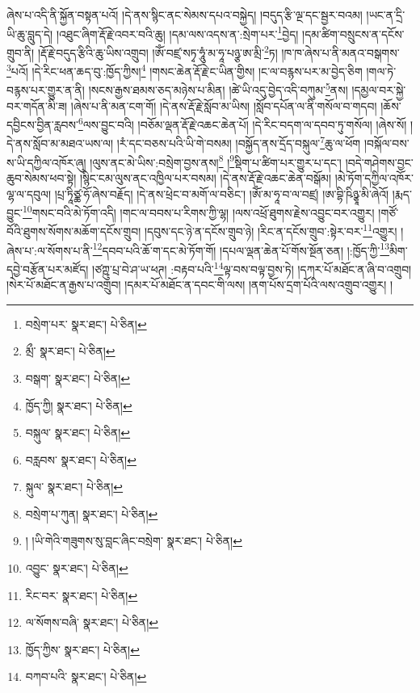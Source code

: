 ཞེས་པ་འདི་ནི་སྐྱོན་བསྟན་པའོ། །དེ་ནས་སྙིང་ནང་སེམས་དཔའ་བསྐྱེད། །བདུད་རྩི་ལྔ་དང་སྦྱར་བའམ། །ཡང་ན་དྲི་ཡི་ཆུ་བླུད་དེ། །འཐུང་ཞིག་རྡོ་རྗེ་འབར་བའི་ཆུ། །དམ་ལས་འདས་ན་:སྲེག་པར་\footnote{བསྲེག་པར་  སྣར་ཐང་།  པེ་ཅིན། }བྱེད། །དམ་ཚིག་བསྲུངས་ན་དངོས་གྲུབ་ནི། །རྡོ་རྗེ་བདུད་རྩིའི་ཆུ་ཡིས་འགྲུབ། །ཨོཾ་བཛྲ་སཏྭ་ཧཱུཾ་མ་ཧཱ་པཉྩ་ཨ་མྲི་\footnote{མྲྀ་  སྣར་ཐང་།  པེ་ཅིན། }ཏ། །ཁ་ཁ་ཞེས་པ་ནི་མནའ་བསྒགས་\footnote{བསྒག་  སྣར་ཐང་།  པེ་ཅིན། }པའོ། །དེ་རིང་ཕན་ཆད་བུ་:ཁྱོད་ཀྱིས།\footnote{ཁྱོད་ཀྱི།  སྣར་ཐང་།  པེ་ཅིན། } །གསང་ཆེན་རྡོ་རྗེ་ང་ཡིན་གྱིས། །ང་ལ་བརྙས་པར་མ་བྱེད་ཅིག །གལ་ཏེ་བརྙས་པར་གྱུར་ན་ནི། །སངས་རྒྱས་ཐམས་ཅད་མཉེས་པ་མིན། །ཚེ་ཡི་འདུ་བྱེད་འདི་བཀུམ་\footnote{བསྐུལ་  སྣར་ཐང་།  པེ་ཅིན། }ནས། །དམྱལ་བར་སྐྱེ་བར་གདོན་མི་ཟ། །ཞེས་པ་ནི་མན་ངག་གོ། །དེ་ནས་རྡོ་རྗེ་སློབ་མ་ཡིས། །སློབ་དཔོན་ལ་ནི་གསོལ་བ་གདབ། །ཆོས་དབྱིངས་བྱིན་རླབས་\footnote{བརླབས་  སྣར་ཐང་།  པེ་ཅིན། }ལས་བྱུང་བའི། །བཅོམ་ལྡན་རྡོ་རྗེ་འཆང་ཆེན་པོ། །དེ་རིང་བདག་ལ་དབབ་ཏུ་གསོལ། །ཞེས་སོ། །དེ་ནས་སློབ་མ་མཐའ་ཡས་ལ། །རཾ་དང་བཅས་པའི་ཡི་གེ་བསམ། །བསྐྱོད་ནས་དྲོད་བསྐུལ་\footnote{སྐུལ་  སྣར་ཐང་།  པེ་ཅིན། }ཆུ་ལ་ཕོག །བསྐོལ་བས་ས་ཡི་དཀྱིལ་འཁོར་ཞུ། །ལུས་ནང་མེ་ཡིས་:བསྲེག་བྱས་ནས།\footnote{བསྲེག་པ་ཀུན།  སྣར་ཐང་།  པེ་ཅིན། } །\footnote{། །ཡི་གེའི་གཟུགས་སུ་བླང་ཞིང་བསྲེག་  སྣར་ཐང་།  པེ་ཅིན། }སྡིག་པ་ཚིག་པར་གྱུར་པ་དང་། །བདེ་གཤེགས་བྱང་ཆུབ་སེམས་ཕབ་སྟེ། །སྙིང་ངམ་ལུས་ནང་འཁྱིལ་པར་བསམ། །དེ་ནས་རྡོ་རྗེ་འཆང་ཆེན་བསྒོམ། །མེ་ཏོག་དཀྱིལ་འཁོར་ལྷ་ལ་དབུལ། །པྲ་ཏཱིཙྪ་ཧོ་ཞེས་བརྗོད། །དེ་ནས་ཕྲེང་བ་མགོ་ལ་བཅིང་། །ཨོཾ་མ་ཧཱ་བ་ལ་བཛྲ། །ཨ་བྷི་ཥིཉྩཱ་མི་ཞེའོ། །རྨད་བྱུང་\footnote{འབྱུང་  སྣར་ཐང་།  པེ་ཅིན། }གསང་བའི་མེ་ཏོག་འདི། །གང་ལ་བབས་པ་རིགས་ཀྱི་ལྷ། །ལས་འཕྲོ་ཐུགས་རྗེས་འབྱུང་བར་འགྱུར། །གཙོ་བོའི་ཐུགས་སོགས་མཆོག་དངོས་གྲུབ། །དབུས་དང་ཉེ་ན་དངོས་གྲུབ་ཉེ། །རིང་ན་དངོས་གྲུབ་:སྟེར་བར་\footnote{རིང་བར་  སྣར་ཐང་།  པེ་ཅིན། }འགྱུར། །ཞེས་པ་:ལ་སོགས་པ་ནི་\footnote{ལ་སོགས་བཞི་  སྣར་ཐང་།  པེ་ཅིན། }དབབ་པའི་ཆོ་ག་དང་མེ་ཏོག་གོ། །དཔལ་ལྡན་ཆེན་པོ་གོས་སྔོན་ཅན། །:ཁྱོད་ཀྱི་\footnote{ཁྱོད་ཀྱིས་  སྣར་ཐང་།  པེ་ཅིན། }མིག་དབྱེ་བརྩོན་པར་མཛོད། །ཙཀྵུ་པྲ་བེ་ཤ་ཡ་ཕཊ། :བརྟབ་པའི་\footnote{བཀབ་པའི་  སྣར་ཐང་།  པེ་ཅིན། }ལྟ་བས་བལྟ་བྱས་ཏེ། །དཀར་པོ་མཐོང་ན་ཞི་བ་འགྲུབ། །སེར་པོ་མཐོང་ན་རྒྱས་པ་འགྲུབ། །དམར་པོ་མཐོང་ན་དབང་གི་ལས། །ནག་པོས་དྲག་པོའི་ལས་འགྲུབ་འགྱུར། །
